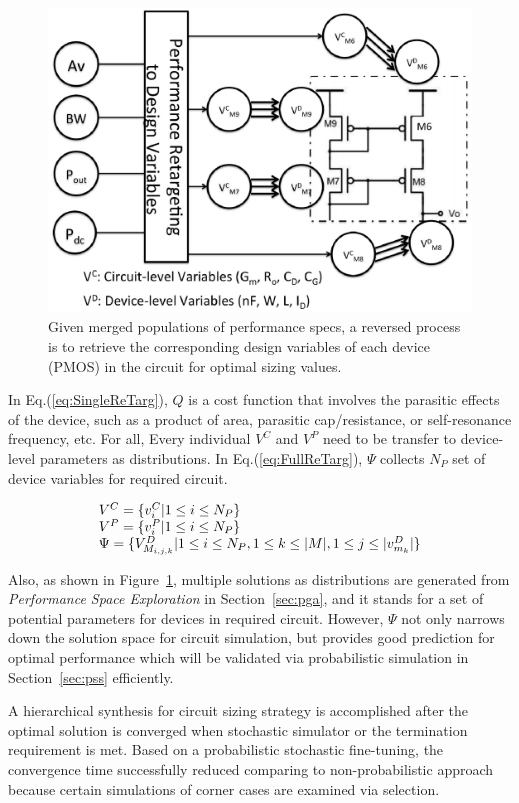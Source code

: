     \begin{figure}[t]
      \centering
      \includegraphics[width=\textwidth]{Fig/Retarg.eps}
      \caption{Given merged populations of performance specs, a reversed process is to retrieve the corresponding design variables of each device (PMOS) in the circuit for optimal sizing values.} 
      \label{fig:Retarg}
    \end{figure}
    
    In Eq.(\ref{eq:SingleReTarg}), $Q$ is a cost function that involves the parasitic effects of the device, such as a product of area, parasitic cap/resistance, or self-resonance frequency, etc. For all, Every individual $V^C$ and $V^P$ need to be transfer to device-level parameters as distributions. In Eq.(\ref{eq:FullReTarg}), $\Psi$ collects $N_P$ set of device variables for required circuit.

    \begin{align}{\label{eq:FullReTarg}}
      \begin{array}{l}
        V^C = \{v^C_i| 1 \leq i \leq N_P\}\\
        V^P = \{v^P_i| 1 \leq i \leq N_P\}\\
        \Psi =  \{V^D_{M_{i,j,k}}| 1\leq i \leq N_P, 1 \leq k \leq |M|, 1 \leq j \leq |v^D_{m_k}|\} 
      \end{array}
    \end{align}

    Also, as shown in Figure~\ref{fig:Retarg}, multiple solutions as distributions are generated from {\it Performance Space Exploration} in Section~\ref{sec:pga}, and it stands for a set of potential parameters for devices in required circuit. However, $\Psi$ not only narrows down the solution space for circuit simulation, but provides good prediction for optimal performance which will be validated via probabilistic simulation in Section~\ref{sec:pss} efficiently. 

  

  A hierarchical synthesis for circuit sizing strategy is accomplished after the optimal solution is converged when stochastic simulator or the termination requirement is met. Based on a probabilistic stochastic fine-tuning, the convergence time successfully reduced comparing to non-probabilistic approach because certain simulations of corner cases are examined via selection. 